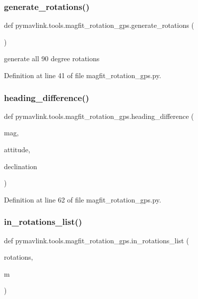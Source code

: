 \subsubsection{\texorpdfstring{generate\_rotations()}{generate\_rotations()}}
{\footnotesize\ttfamily def pymavlink.\+tools.\+magfit\+\_\+rotation\+\_\+gps.\+generate\+\_\+rotations (\begin{DoxyParamCaption}{ }\end{DoxyParamCaption})}

\begin{DoxyVerb}generate all 90 degree rotations\end{DoxyVerb}
 

Definition at line 41 of file magfit\+\_\+rotation\+\_\+gps.\+py.

\mbox{\label{namespacepymavlink_1_1tools_1_1magfit__rotation__gps_a310cbaeb70b1110d0e0c30bb055849c6}} 
\subsubsection{\texorpdfstring{heading\_difference()}{heading\_difference()}}
{\footnotesize\ttfamily def pymavlink.\+tools.\+magfit\+\_\+rotation\+\_\+gps.\+heading\+\_\+difference (\begin{DoxyParamCaption}\item[{}]{mag,  }\item[{}]{attitude,  }\item[{}]{declination }\end{DoxyParamCaption})}



Definition at line 62 of file magfit\+\_\+rotation\+\_\+gps.\+py.

\mbox{\label{namespacepymavlink_1_1tools_1_1magfit__rotation__gps_a603524ffd72ee7855f58c5689c0903c2}} 
\subsubsection{\texorpdfstring{in\_rotations\_list()}{in\_rotations\_list()}}
{\footnotesize\ttfamily def pymavlink.\+tools.\+magfit\+\_\+rotation\+\_\+gps.\+in\+\_\+rotations\+\_\+list (\begin{DoxyParamCaption}\item[{}]{rotations,  }\item[{}]{m }\end{DoxyParamCaption})}



